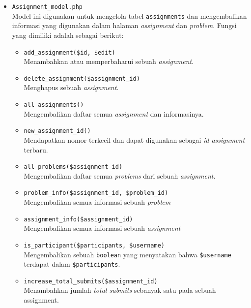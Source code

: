 \begin{itemize}
      \item \verb|Assignment_model.php| \\
            Model ini digunakan untuk mengelola tabel \verb|assignments| dan mengembalikan informasi yang digunakan dalam halaman \textit{assignment} dan \textit{problem}. Fungsi yang dimiliki adalah sebagai berikut:

            \begin{itemize}
                  \item \verb|add_assignment($id, $edit)| \\
                        Menambahkan atau memperbaharui sebuah \textit{assignment}.
                  \item \verb|delete_assignment($assignment_id)| \\
                        Menghapus sebuah \textit{assignment}.
                  \item \verb|all_assignments()| \\
                        Mengembalikan daftar semua \textit{assignment} dan informasinya.
                  \item \verb|new_assignment_id()| \\
                        Mendapatkan nomor terkecil dan dapat digunakan sebagai \textit{id assignment} terbaru.
                  \item \verb|all_problems($assignment_id)| \\
                        Mengembalikan daftar semua \textit{problems} dari sebuah \textit{assignment}.
                  \item \verb|problem_info($assignment_id, $problem_id)| \\
                        Mengembalikan semua informasi sebuah \textit{problem}
                  \item \verb|assignment_info($assignment_id)| \\
                        Mengembalikan semua informasi sebuah \textit{assignment}
                  \item \verb|is_participant($participants, $username)| \\
                        Mengembalikan sebuah \verb|boolean| yang menyatakan bahwa \verb|$username| terdapat dalam \verb|$participants|.
                  \item \verb|increase_total_submits($assignment_id)| \\
                        Menambahkan jumlah \textit{total submits} sebanyak satu pada sebuah assignment.

\end{itemize}
\end{itemize}
